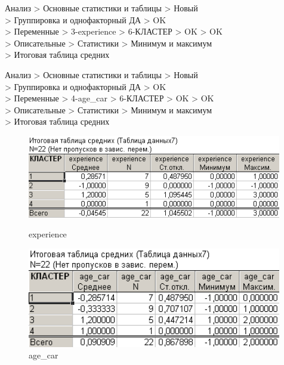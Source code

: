 Анализ > Основные статистики и таблицы > Новый\\
> Группировка и однофакторный ДА > OK\\
> Переменные > 3-experience > 6-КЛАСТЕР > OK > OK\\
> Описательные > Статистики > Минимум и максимум\\
> Итоговая таблица средних

Анализ > Основные статистики и таблицы > Новый\\
> Группировка и однофакторный ДА > OK\\
> Переменные > 4-age\_car > 6-КЛАСТЕР > OK > OK\\
> Описательные > Статистики > Минимум и максимум\\
> Итоговая таблица средних

\begin{figure}[!h]
  \centering
  \begin{minipage}{0.49\textwidth}
    \centering

    \includegraphics[width=0.99\textwidth]
    {inc/cars_my/3.7.PNG}

    \caption{experience}
    \label{fig:3_7}
  \end{minipage}
  \begin{minipage}{0.49\textwidth}
    \centering

    \includegraphics[width=0.99\textwidth]
    {inc/cars_my/3.8.PNG}

    \caption{age\_car}
    \label{fig:3_8}
  \end{minipage}
\end{figure}


